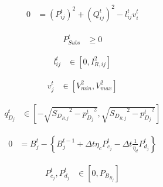 \documentclass[../../outputs/main.tex]{subfiles}
\begin{document}
\vspace{-1.5em} %

\begin{align}
    {0} &= {(P_{ij}^{t})^2 + (Q_{ij}^{t})^2 - l_{ij}^t v_i^t} \label{eq:ApparentPowerEquationBFM} &&
\end{align}

\vspace{-1.5em} %

\begin{align}
    {P^t_{Subs}} &\geq {0} \label{eq:substationRealPowerLimits} &&
\end{align}

\vspace{-1.5em} %

\begin{align}
    { l^{t}_{ij} } &\in { \left[ 0, I^{2}_{R, ij}
    \right] } \label{eq:lim_lij} &&
\end{align}

\vspace{-1.5em} %

\begin{align}
    { v^{t}_{j} } &\in { \left[ V^{2}_{min}, V^{2}_{max} \right]} \label{eq:lim_vj} &&
\end{align}

\vspace{-1.5em} %

\begin{align}
    { q^{t}_{D_{j}} } 
    &\in
    { \left[-\sqrt{ {S_{D_{R, j}}}^2 - {p^{t}_{D_{j}}}^2}, \sqrt{ {S_{D_{R, j}}}^2 - {p^{t}_{D_{j}}}^2}\right] } \label{eq:qDj} &&
\end{align}

\vspace{-1.5em} %

\begin{align}
    {0} &= {  B_{j}^{t} - \left\{B_{j}^{t-1} + \Delta t  \eta_c P_{c_j}^t - \Delta t\frac{1}{\eta_d} P_{d_j}^t \right\} } \label{eq:SOC-j} &&
\end{align}

\vspace{-1.5em} %

\begin{align}
    { P^{t}_{c_{j}}, P^{t}_{d_{j}} }
    &\in
    { \left[ 0, P_{B_{R_{j}}} \right]} \label{eq:lim_PcPdj} &&
\end{align}
\end{document}
